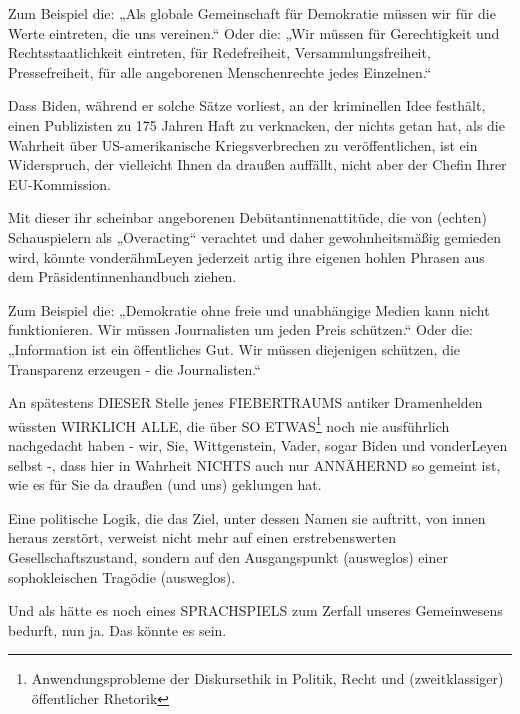 \begin{multicols}{2}
Zum Beispiel die: „Als globale Gemeinschaft für Demokratie müssen wir für die Werte eintreten, die uns vereinen.“ Oder die: „Wir müssen für Gerechtigkeit und
Rechtsstaatlichkeit eintreten, für Redefreiheit, Versammlungsfreiheit, Pressefreiheit, für alle angeborenen Menschenrechte jedes Einzelnen.“

Dass Biden, während er solche Sätze vorliest, an der kriminellen Idee festhält, einen Publizisten zu 175 Jahren
Haft zu verknacken, der nichts getan hat, als die Wahrheit über US-amerikanische Kriegsverbrechen zu veröffentlichen, ist ein Widerspruch, der vielleicht Ihnen da
draußen auffällt, nicht aber der Chefin Ihrer EU-Kommission.

Mit dieser ihr scheinbar angeborenen Debütantinnenattitüde, die von (echten) Schauspielern als „Overacting“
verachtet und daher gewohnheitsmäßig gemieden wird,
könnte vonderähmLeyen jederzeit artig ihre eigenen
hohlen Phrasen aus dem Präsidentinnenhandbuch ziehen.

Zum Beispiel die: „Demokratie ohne freie und unabhängige Medien kann nicht funktionieren. Wir müssen Journalisten um jeden Preis schützen.“ Oder die: „Information
ist ein öffentliches Gut. Wir müssen diejenigen schützen,
die Transparenz erzeugen - die Journalisten.“

An spätestens DIESER Stelle jenes FIEBERTRAUMS antiker Dramenhelden wüssten WIRKLICH ALLE, die über
SO ETWAS\footnote[37]{Anwendungsprobleme der Diskursethik in Politik, Recht und (zweitklassiger) öffentlicher Rhetorik} noch nie ausführlich nachgedacht haben
- wir, Sie, Wittgenstein, Vader, sogar Biden und vonderLeyen selbst -, dass hier in Wahrheit NICHTS auch nur
ANNÄHERND so gemeint ist, wie es für Sie da draußen
(und uns) geklungen hat.

Eine politische Logik, die das Ziel, unter dessen Namen
sie auftritt, von innen heraus zerstört, verweist nicht
mehr auf einen erstrebenswerten Gesellschaftszustand,
sondern auf den Ausgangspunkt (ausweglos) einer sophokleischen Tragödie (ausweglos).

Und als hätte es noch eines SPRACHSPIELS zum Zerfall
unseres Gemeinwesens bedurft, nun ja. Das könnte es
sein.




\end{multicols}
\newpage
\pagecolor{assangered}\afterpage{\nopagecolor}
